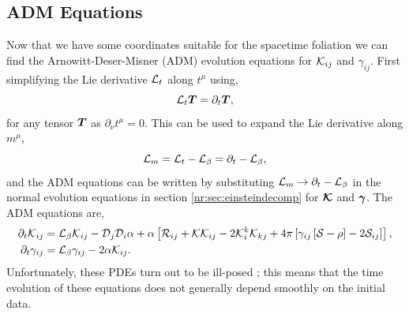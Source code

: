 \subsection{ADM Equations} \label{nr:sec:ADM}
Now that we have some coordinates suitable for the spacetime foliation we can find the Arnowitt-Deser-Misner (ADM) evolution equations for $\mathcal{K}_{ij}$ and $\gamma_{ij}$. First simplifying the Lie derivative $\mathcal{L}_t$ along $t^\mu$ using,
\begin{equation}
\mathcal{L}_t \boldsymbol{T} = \partial_t \boldsymbol{T},
\end{equation}
for any tensor $\boldsymbol{T}$ as $\partial_\nu t^\mu=0$. This can be used to expand the Lie derivative along $m^\mu$,
\begin{equation} \mathcal{L}_m = \mathcal{L}_{t} - \mathcal{L}_\beta  = \partial_t - \mathcal{L}_\beta,\end{equation}
and the ADM equations can be written by substituting $\mathcal{L}_m\rightarrow \partial_t - \mathcal{L}_\beta$ in the normal evolution equations in section \ref{nr:sec:einsteindecomp} for $\boldsymbol{\mathcal{K}}$ and $\boldsymbol{\gamma}$. The ADM equations are,
\begin{align} 
\partial_t \mathcal{K}_{ij} &= \mathcal{L}_\beta \mathcal{K}_{ij}  -\mathcal{D}_j\mathcal{D}_i \alpha + \alpha \left[ \mathcal{R}_{ij} + \mathcal{K}\mathcal{K}_{ij} - 2\mathcal{K}^k_i\mathcal{K}_{kj} + 4\pi \left[ \gamma_{ij}\left[ \mathcal{S}-\rho\right]-2\mathcal{S}_{ij}\right]\right],\\
\partial_t \gamma_{ij} &= \mathcal{L}_\beta \gamma_{ij} - 2\alpha\mathcal{K}_{ij}.\end{align}
Unfortunately, these PDEs turn out to be ill-posed \cite{frittelli2000ill}; this means that the time evolution of these equations does not generally depend smoothly on the initial data.


